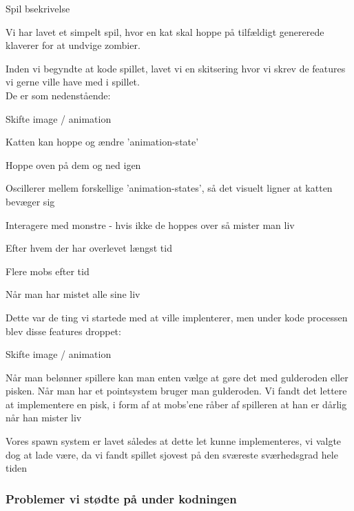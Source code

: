 \documentclass[12pt, a4paper, hidelinks]{article}
\begin{document}
\vspace{10mm}

Spil bsekrivelse

Vi har lavet et simpelt spil, hvor en kat skal hoppe på tilfældigt genererede klaverer for at undvige zombier.


\vspace{10mm}

Inden vi begyndte at kode spillet, lavet vi en skitsering hvor vi skrev de features vi gerne ville have med i spillet. 
\vspace{5mm}
\\ De er som nedenstående:
\begin{labeling}{Skifte image / animation  }
\item	[Hoppe]  					Katten kan hoppe og ændre 'animation-state'
\item[Interagere med Blokke] 		Hoppe oven på dem og ned igen
\item[Skifte image / animation]		Oscillerer mellem forskellige 'animation-states', så det visuelt ligner at katten bevæger sig 
\item[Monstre] 					Interagere med monstre - hvis ikke de hoppes over så mister man liv
\item[Pointsystem]  				Efter hvem der har overlevet længst tid
\item[Sværhedsgrad]  			Flere mobs efter tid
\item[Spillets slut]  				Når man har mistet alle sine liv
\end{labeling}

\vspace{10mm}

Dette var de ting vi startede med at ville implenterer, men under kode processen blev disse features  droppet:
\begin{labeling}{Skifte image / animation  }
\item[Pointsystem]  				Når man belønner spillere kan man enten vælge at gøre det med gulderoden eller pisken. Når man har et pointsystem bruger man gulderoden. Vi fandt det lettere at implementere en pisk, i form af at mobs'ene råber af spilleren at han er dårlig når han mister liv
\item[Sværhedsgrad]  			Vores spawn system er lavet således at dette let kunne implementeres, vi valgte dog at lade være, da vi fandt spillet sjovest på den sværeste sværhedsgrad hele tiden
\end{labeling}


\subsubsection{Problemer vi stødte på under kodningen}
\end{document}

